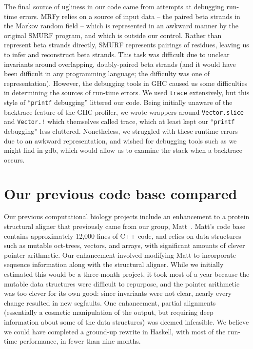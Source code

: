 \documentclass[preprint,nocopyrightspace,times]{sigplanconf}
\begin{document}
The final source of ugliness in our code came from attempts at debugging 
run-time errors. MRFy relies on a source of input data -- the paired beta 
strands in the Markov random field -- which is represented in an awkward manner 
by the original SMURF program, and which is outside our control. Rather than 
represent beta strands directly, SMURF represents pairings of residues, leaving 
us to infer and reconstruct beta strands. This task was difficult due to 
unclear invariants around overlapping, doubly-paired beta strands (and it would 
have been difficult in any programming language; the difficulty was one of 
representation). However, the debugging tools in GHC caused us some 
difficulties in determining the sources of run-time errors. We used 
\texttt{trace} extensively, but this style of ``\texttt{printf} debugging'' 
littered our code. Being initially unaware of the backtrace feature of the GHC 
profiler, we wrote wrappers around \texttt{Vector.slice} and \texttt{Vector.!} 
which themselves called trace, which at least kept our ``\texttt{printf} 
debugging'' less cluttered. Nonetheless, we struggled with these runtime errors 
due to an awkward representation, and wished for debugging tools such as we 
might find in gdb, which would allow us to examine the stack when a backtrace 
occurs.
 
 
\section{Our previous code base compared}

Our previous computational biology projects include an enhancement to a protein 
structural aligner that previously came from our group, Matt~\cite{matt}. 
Matt's code base contains approximately 12,000 lines of C++ code, and relies on 
data structures such as mutable oct-trees, vectors, and arrays, with 
significant amounts of clever pointer arithmetic. Our enhancement involved 
modifying Matt to incorporate sequence information along with the structural 
aligner. While we initially estimated this would be a three-month project, it 
took most of a year because the mutable data structures were difficult to 
repurpose, and the pointer arithmetic was too clever for its own good: since 
invariants were not clear, nearly every change resulted in new segfaults. One 
enhancement, partial alignments (essentially a cosmetic manipulation of the 
output, but requiring deep information about some of the data structures) was 
deemed infeasible. We believe we could have completed a ground-up rewrite in 
Haskell, with most of the run-time performance, in fewer than nine months.
\end{document}
